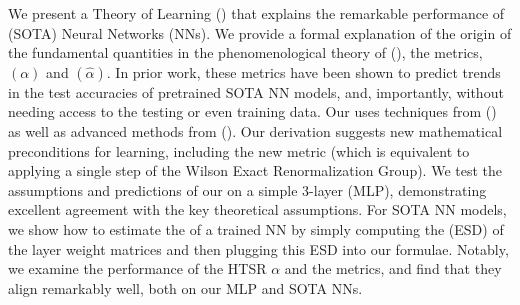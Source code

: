 We present a \SemiEmpirical Theory of Learning (\SETOL)
that explains the remarkable performance of \StateOfTheArt (SOTA) Neural Networks (NNs).
We provide a formal explanation of the origin of the
fundamental quantities in the phenomenological theory of  \HeavyTailedSelfRegularization (\HTSR), the 
\HeavyTailed \PowerLaw \LayerQuality metrics,
\ALPHAHAT $(\alpha)$ and \ALPHAHAT $(\hat{\alpha})$.
In prior work, these metrics have been shown to predict trends in the test accuracies of pretrained SOTA NN models,
and, importantly,  without needing access to the testing or even training data.
Our \SETOL
uses techniques from \StatisticalMechanics (\STATMECH) as well as advanced methods from \RandomMatrixTheory (\RMT). Our derivation suggests new mathematical preconditions for \emph{\Ideal} learning, including the new \TRACELOG metric (which is equivalent to applying a single step of the Wilson Exact Renormalization Group).
We test the assumptions and predictions of our \SETOL on a simple 3-layer
\MultiLayer \Perceptron (MLP), demonstrating excellent agreement with the key theoretical assumptions. 
For SOTA NN models, we show how to estimate the \ModelQuality of a trained NN by simply computing the \EmpiricalSpectralDensity (ESD) of the layer weight matrices and
then plugging this ESD into our \SETOL formulae.
Notably, we examine the performance of the HTSR $\alpha$ and the \SETOL \TRACELOG \LayerQuality metrics, and find that they align
remarkably well, both on our MLP and SOTA NNs.


